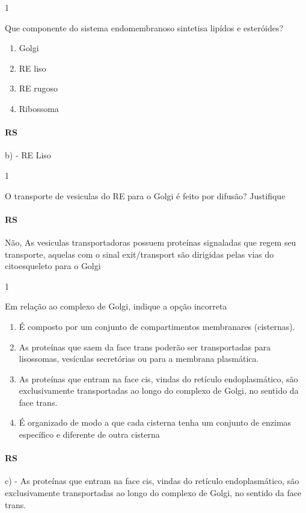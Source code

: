 \documentclass[\mainfilename]{subfiles}
\begin{document}
\begin{questionBox}1{}
    
    Que componente do sistema endomembranoso sintetisa lipídos e esteróides?

    \begin{enumerate}[label=\alph{enumi}) ]
        \item Golgi
        \item RE liso
        \item RE rugoso
        \item Ribossoma        
    \end{enumerate}

    \paragraph*{RS} b) - RE Liso
    
\end{questionBox}

\begin{questionBox}1{}
    
    O transporte de vesiculas do RE para o Golgi é feito por difusão? Justifique

    \paragraph*{RS}
    Não, As vesiculas transportadoras possuem proteínas signaladas que regem seu transporte, aquelas com o sinal exit/transport são dirigidas pelas vias do citoesqueleto para o Golgi
    
\end{questionBox}

\begin{questionBox}1{}
    
    Em relação ao complexo de Golgi, indique a opção incorreta

    \begin{enumerate}[label=\alph{enumi}) ]
        \item É composto por um conjunto de compartimentos membranares (cisternas).
        \item As proteínas que saem da face trans poderão ser transportadas para lisossomas, vesículas secretórias ou para a membrana plasmática.
        \item As proteínas que entram na face cis, vindas do retículo endoplasmático, são exclusivamente transportadas ao longo do complexo de Golgi, no sentido da face trans.
        \item É organizado de modo a que cada cisterna tenha um conjunto de enzimas específico e diferente de outra cisterna
    \end{enumerate}

    \paragraph*{RS} c) - As proteínas que entram na face cis, vindas do retículo endoplasmático, são exclusivamente transportadas ao longo do complexo de Golgi, no sentido da face trans.
    
\end{questionBox}
\end{document}
